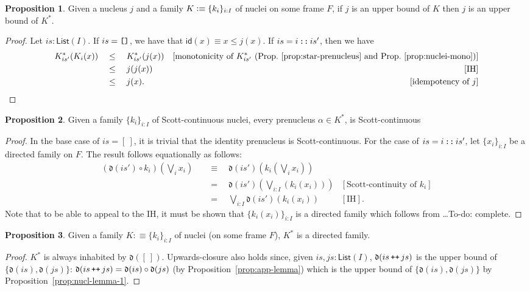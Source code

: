 \documentclass[a4paper, 11pt]{article}
\theoremstyle{definition}
\newtheorem{prop}{Proposition}
\newcommand{\is}{\vcentcolon\equiv}
\DeclareMathOperator{\emptyl}{\text{\texttt{[]}}}
\DeclareMathOperator{\cons}{\text{\texttt{::}}}
\DeclareMathOperator{\append}{\text{\texttt{++}}}
\newcommand{\todo}[1]{{\large\color{orange}\textsf{To-do: #1.}}}
\begin{document}
\begin{prop}\label{prop:star-ub}
  Given a nucleus $j$ and a family $K \is \{ k_i \}_{i : I}$ of nuclei on some frame $F$, if $j$ is
  an upper bound of $K$ then $j$ is an upper bound of $K^*$.
\end{prop}
\begin{proof}
  Let $is : \mathsf{List}(I)$. If $is = \emptyl$, we have that $\mathsf{id}(x) \equiv x \le j(x)$.
  If $is = i \cons is'$, then we have
  \begin{align*}
       K^*_{is'}(K_i(x))
  \quad&\le\quad K^*_{is'}(j(x)) & [\text{monotonicity of $K^*_{is'}$ (Prop.~\ref{prop:star-prenucleus} and Prop.~\ref{prop:nuclei-mono})}] \\
  \quad&\le\quad j(j(x))        & [\text{IH}] \\
  \quad&\le\quad j(x).          & [\text{idempotency of $j$}]
  \end{align*}
\end{proof}

\begin{prop}
  Given a family $\{ k_i \}_{i : I}$ of Scott-continuous nuclei, every
  prenucleus $\alpha \in K^*$, is Scott-continuous
\end{prop}
\begin{proof}
  In the base case of $is = \mathtt{[\ ]}$, it is trivial that the identity
  prenucleus is Scott-continuous. For the case of $is = i \cons is'$, let
  $\{ x_i \}_{i : I}$ be a directed family on $F$. The result follows equationally
  as follows:
  \begin{align*}
    (\mathfrak{d}(is') \circ k_i) \left(\bigvee_i x_i\right)
    &\quad\equiv\quad \mathfrak{d}(is')\left(k_i \left( \bigvee_i x_i \right)\right) & \\
    &\quad=\quad \mathfrak{d}(is')\left(\bigvee_{i : I} \left( k_i(x_i) \right)\right) & [\text{Scott-continuity of $k_i$}]\\
    &\quad=\quad \bigvee_{i : I} \mathfrak{d}(is')(k_i(x_i)) & [\text{IH}].
  \end{align*}
  Note that to be able to appeal to the IH, it must be shown that
  $\{ k_i(x_i) \}_{i : I}$ is a directed family which follows from \ldots \todo{complete}
\end{proof}

\begin{prop}
  Given a family $K :\equiv \{ k_i \}_{i : I}$ of nuclei (on some frame $F$), $K^*$
  is a directed family.
\end{prop}
\begin{proof}
  $K^*$ is always inhabited by $\mathfrak{d}(\mathtt{[\ ]})$. Upwards-closure also holds since,
  given $is, js : \mathsf{List}(I)$, $\mathfrak{d}(is \append js)$ is the upper bound of $\{
  \mathfrak{d}(is), \mathfrak{d}(js) \}$: $\mathfrak{d}(is \append js) = \mathfrak{d}(is) \circ
  \mathfrak{d}(js)$ (by Proposition~\ref{prop:app-lemma}) which is the upper bound of $\{
  \mathfrak{d}(is), \mathfrak{d}(js) \}$ by Proposition~\ref{prop:nucl-lemma-1}.
\end{proof}
\end{document}
